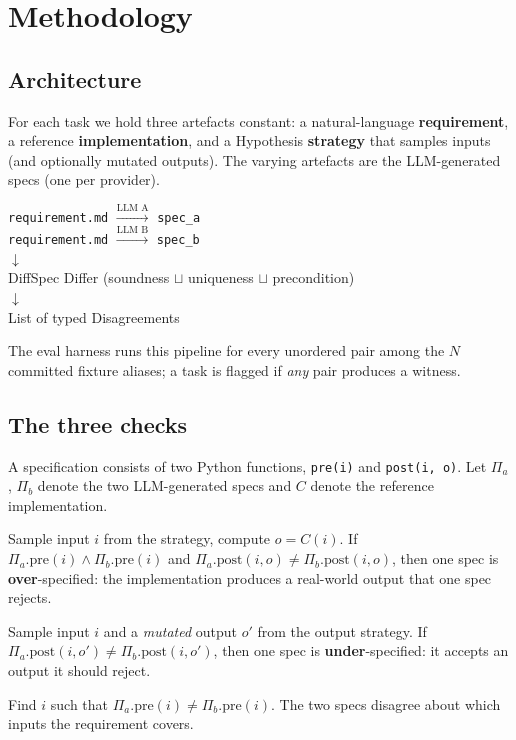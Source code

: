 \documentclass[11pt,a4paper]{article}
\begin{document}
\section{Methodology}

\subsection{Architecture}

For each task we hold three artefacts constant: a natural-language
\textbf{requirement}, a reference \textbf{implementation}, and a
Hypothesis \textbf{strategy} that samples inputs (and optionally
mutated outputs). The varying artefacts are the LLM-generated specs (one per provider).

\begin{center}
\small
\texttt{requirement.md} $\xrightarrow{\text{LLM A}}$ \texttt{spec\_a} \\
\texttt{requirement.md} $\xrightarrow{\text{LLM B}}$ \texttt{spec\_b} \\
$\downarrow$ \\
DiffSpec Differ (soundness $\sqcup$ uniqueness $\sqcup$ precondition) \\
$\downarrow$ \\
List of typed Disagreements
\end{center}

\noindent The eval harness runs this pipeline for every unordered pair
among the $N$ committed fixture aliases; a task is flagged if \emph{any}
pair produces a witness.

\subsection{The three checks}

A specification consists of two Python functions, \texttt{pre(i)} and
\texttt{post(i, o)}. Let $\Pi_a$, $\Pi_b$ denote the two LLM-generated
specs and $C$ denote the reference implementation.

\begin{description}[leftmargin=*]
\item[Soundness check.] Sample input $i$ from the strategy, compute
$o = C(i)$. If $\Pi_a.\text{pre}(i) \land \Pi_b.\text{pre}(i)$ and
$\Pi_a.\text{post}(i, o) \neq \Pi_b.\text{post}(i, o)$, then one
spec is \textbf{over}-specified: the implementation produces a
real-world output that one spec rejects.

\item[Uniqueness check.] Sample input $i$ and a \emph{mutated} output
$o'$ from the output strategy. If $\Pi_a.\text{post}(i, o') \neq
\Pi_b.\text{post}(i, o')$, then one spec is \textbf{under}-specified:
it accepts an output it should reject.

\item[Precondition check.] Find $i$ such that $\Pi_a.\text{pre}(i)
\neq \Pi_b.\text{pre}(i)$. The two specs disagree about which inputs
the requirement covers.
\end{description}
\end{document}

